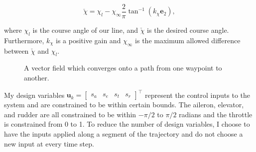 \documentclass[letterpaper, 10 pt, conference]{ieeeconf}  %
\begin{document}
\begin{equation}
\check{\chi}=\chi_{l}-\chi_{\infty}\frac{2}{\pi}\tan^{-1}\left(k_{\chi}\mathbf{e}_{2}\right),
\end{equation}

where $\chi_l$ is the course angle of our line, and $\check{\chi}$ is the desired course angle. Furthermore, $k_\chi$ is a positive gain and $\chi_\infty$ is the maximum allowed difference between $\check{\chi}$ and $\chi_l$.


\begin{figure}
	\centering
	\caption{A vector field which converges onto a path from one waypoint to another.}
	\label{fig:vet_field}
	
\end{figure}




My design variables $\mathbf{u}_k =\begin{bmatrix}s_{a} & s_{e} & s_{t} & s_{r}\end{bmatrix}^{\top}$ represent the control inputs to the system and are constrained to be within certain bounds. The aileron, elevator, and rudder are all constrained to be within $-\pi/2$ to $\pi/2$ radians and the throttle is constrained from 0 to 1. To reduce the number of design variables, I choose to have the inputs applied along a segment of the trajectory and do not choose a new input at every time step. 
\end{document}
